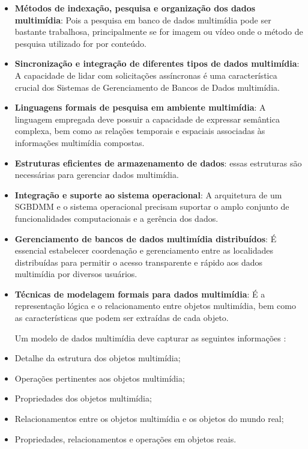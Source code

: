 \documentclass[12pt]{article}
\begin{document}
	\begin{itemize}
		
		\item \textbf {Métodos de indexação, pesquisa e organização dos dados
			multimídia}: Pois a pesquisa em banco de dados multimídia pode ser bastante trabalhosa, principalmente se for imagem ou vídeo onde o método de pesquisa utilizado for por conteúdo.
		
		\item \textbf { Sincronização e integração de diferentes tipos de dados multimídia}: A capacidade de lidar com solicitações assíncronas é uma característica crucial dos Sistemas de Gerenciamento de Bancos de Dados multimídia.
		
		\item \textbf{Linguagens formais de pesquisa em ambiente multimídia}: A linguagem empregada deve possuir a capacidade de expressar semântica complexa, bem como as relações temporais e espaciais associadas às informações multimídia compostas.
		
		\item \textbf {Estruturas eficientes de armazenamento de dados}: essas estruturas são necessárias para gerenciar dados multimídia.
		
		\item \textbf {Integração e suporte ao sistema operacional}: A arquitetura de um  SGBDMM e o sistema operacional precisam suportar o amplo conjunto de
		funcionalidades computacionais e a gerência dos dados.
		
		\item \textbf {Gerenciamento de bancos de dados multimídia distribuídos}: É essencial estabelecer coordenação e gerenciamento entre as localidades distribuídas para permitir o acesso transparente e rápido aos dados multimídia por diversos usuários.
		
		\item \textbf {Técnicas de modelagem formais para dados multimídia}: É a representação lógica e o relacionamento entre objetos multimídia, bem como as características que podem ser extraídas de cada objeto.
		
		\vspace{1em}
		
		Um modelo de dados multimídia deve capturar as seguintes informações \cite{debanco}:
		\vspace{1em}
		\item Detalhe da estrutura dos objetos multimídia;
		\item Operações pertinentes aos objetos multimídia;
		\item Propriedades dos objetos multimídia;
		\item Relacionamentos entre os objetos multimídia e os objetos do mundo real;
		\item Propriedades, relacionamentos e operações em objetos reais.
		
	\end{itemize}
	
\end{document}

